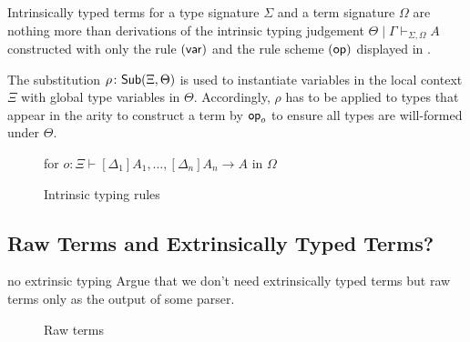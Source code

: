 \documentclass[acmsmall]{acmart}
\theoremstyle{acmdefinition}
\begin{document}
Intrinsically typed terms for a type signature $\Sigma$ and a term signature $\Omega$ are nothing more than derivations of the intrinsic typing judgement $\boxed{\Theta \mid \Gamma \vdash_{\Sigma, \Omega} A}$ constructed with only the rule $(\var)$ and the rule scheme $(\termOp)$ displayed in .

The substitution $\rho\colon \Sub{\Xi}{\Theta}$ is used to instantiate variables in the local context $\Xi$ with global type variables in $\Theta$.
Accordingly, $\rho$ has to be applied to types that appear in the arity to construct a term by $\termOp_o$ to ensure all types are will-formed under $\Theta$.

\begin{figure}
  \centering
  \small
  for $o\colon \Xi \vdash [\Delta_1]A_1, \ldots, [\Delta_{n}]A_{n} \to A$ in $\Omega$
  \caption{Intrinsic typing rules}
  \label{fig:intrinsic-typing}
\end{figure}
\subsection{Raw Terms and Extrinsically Typed Terms?}
\begin{LTannote}{no extrinsic typing}
Argue that we don't need extrinsically typed terms but raw terms only as the output of some parser.
\end{LTannote}

\begin{figure}
  \centering
  \small
  \begin{mathpar}
  \end{mathpar}
  
  \caption{Raw terms}
\end{figure}
\end{document}
